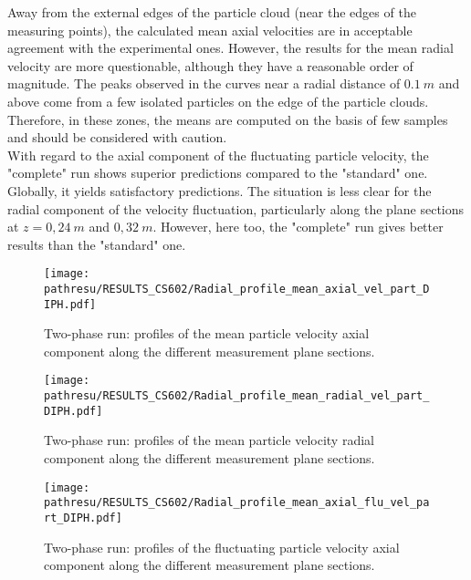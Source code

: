 \documentclass[a4paper,twoside,12pt]{article}
\newcommand{\pathresu}{./FIGURES}
\begin{document}
\noindent
Away from the external edges of the particle cloud (near the edges of the measuring points), the calculated mean axial velocities are in acceptable agreement with the experimental ones. However, the results for the mean radial velocity are more questionable, although they have a reasonable order of magnitude. The peaks observed in the curves near a radial distance of $0.1~m$ and above come from a few isolated particles on the edge of the particle clouds. Therefore, in these zones, the means are computed on the basis of few samples and should be considered with caution. \\ With regard to the axial component of the fluctuating particle velocity, the "complete" run shows superior predictions compared to the "standard" one. Globally, it yields satisfactory predictions. The situation is less clear for the radial component of the velocity fluctuation, particularly along the plane sections at $z = 0,24~m$ and $0,32~m$. However, here too, the "complete" run gives better results than the "standard" one.

\noindent

\begin{figure}[h]
   \centerline{\texttt{[image: \\pathresu/RESULTS\_CS602/Radial\_profile\_mean\_axial\_vel\_part\_DIPH.pdf]}}
   \caption{Two-phase run: profiles of the mean particle velocity axial component along the different measurement plane sections.}
   \label{VitZPart}
\end{figure}

\begin{figure}[h]
   \centerline{\texttt{[image: \\pathresu/RESULTS\_CS602/Radial\_profile\_mean\_radial\_vel\_part\_DIPH.pdf]}}
   \caption{Two-phase run: profiles of the mean particle velocity radial component along the different measurement plane sections.}
   \label{VitXPart}
\end{figure}

\begin{figure}[h]
   \centerline{\texttt{[image: \\pathresu/RESULTS\_CS602/Radial\_profile\_mean\_axial\_flu\_vel\_part\_DIPH.pdf]}}
   \caption{Two-phase run: profiles of the fluctuating particle velocity axial component along the different measurement plane sections.}
   \label{VitZpPart}
\end{figure}
\end{document}
